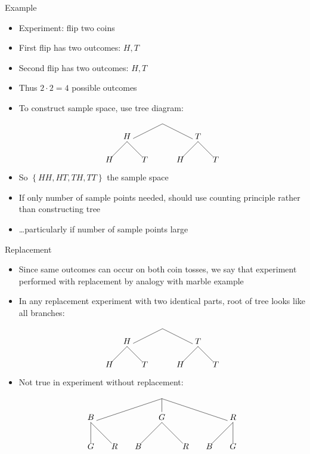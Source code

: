 \documentclass[handout]{beamer}
\theoremstyle{definition}
\begin{document}
\begin{frame}{Example}
\begin{itemize}
\item Experiment: flip two coins
\item First flip has two outcomes: $H,T$
\item Second flip has two outcomes: $H,T$
\item Thus $2\cdot 2=4$ possible outcomes
\item To construct sample space, use tree diagram:
\[\begin{xy}<.75cm,0cm>:
(0,0)="0";
(-2,-1)="-21";
(2,-1)="21";
"0";"-21"*+!D{H}**\dir{-};
"0";"21"*+!D{T}**\dir{-};
"-21";(-3,-2)*{H}**\dir{-};
"-21";(-1,-2)*{T}**\dir{-};
"21";(1,-2)*{H}**\dir{-};
"21";(3,-2)*{T}**\dir{-};
\end{xy}\]
\item So $\left\{HH,HT,TH,TT\right\}$ the sample space
\item If only \alert{number} of sample points needed,
should use counting principle rather than constructing tree
\item \dots particularly if number of sample points large
\end{itemize}
\end{frame}

\begin{frame}{Replacement}
\begin{itemize}
\item Since same outcomes can occur on both coin
tosses, we say that experiment performed \alert{with replacement}
by analogy with marble example
\item In any replacement experiment with two identical parts,
root of tree looks like all branches:
\[\begin{xy}<.75cm,0cm>:
(0,0)="0";
(-2,-1)="-21";
(2,-1)="21";
"0";"-21"*+!D{H}**\dir{-};
"0";"21"*+!D{T}**\dir{-};
"-21";(-3,-2)*{H}**\dir{-};
"-21";(-1,-2)*{T}**\dir{-};
"21";(1,-2)*{H}**\dir{-};
"21";(3,-2)*{T}**\dir{-};
\end{xy}\]
\item Not true in experiment \alert{without replacement}:
\[\begin{xy}<1cm,0cm>:
(0,0)="0";
(-3,-1)="-31";
(0,-1)="01";
(3,-1)="31";
"0";"-31"*+!D{B}**\dir{-};
"0";"01"*+!D{G}**\dir{-};
"0";"31"*+!D{R}**\dir{-};
"-31";(-3,-2)*{G}**\dir{-};
"-31";(-2,-2)*{R}**\dir{-};
"01";(-1,-2)*{B}**\dir{-};
"01";(1,-2)*{R}**\dir{-};
"31";(2,-2)*{B}**\dir{-};
"31";(3,-2)*{G}**\dir{-};
\end{xy}\]
\end{itemize}
\end{frame}
\end{document}
